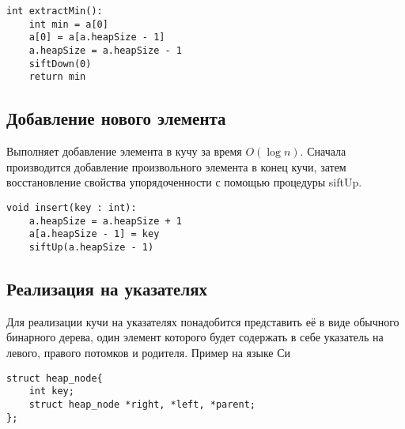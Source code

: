 \begin{verbatim}
int extractMin():
    int min = a[0]
    a[0] = a[a.heapSize - 1]
    a.heapSize = a.heapSize - 1
    siftDown(0)
    return min
\end{verbatim}

\subsection{Добавление нового элемента}

Выполняет добавление элемента в кучу за время $O(\log n)$.
Сначала производится добавление произвольного элемента в конец кучи, затем восстановление свойства упорядоченности с помощью процедуры siftUp.

\begin{verbatim}
void insert(key : int):
    a.heapSize = a.heapSize + 1
    a[a.heapSize - 1] = key
    siftUp(a.heapSize - 1)
\end{verbatim}

\subsection*{Реализация на указателях}
Для реализации кучи на указателях понадобится представить её в виде обычного бинарного дерева, один элемент которого будет содержать в себе указатель на левого, правого потомков и родителя.
Пример на языке Си

\begin{verbatim}
struct heap_node{
    int key;
    struct heap_node *right, *left, *parent;
};
\end{verbatim}

